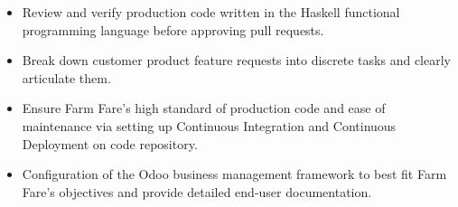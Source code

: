\documentclass[10pt,a4paper]{altacv}
\begin{document}

\begin{fullwidth}
\makecvheader
\end{fullwidth}





\small{
\begin{itemize}
\item Review and verify production code written in the Haskell functional programming language before approving pull requests.

\item Break down customer product feature requests into discrete tasks and clearly articulate them.

\item Ensure Farm Fare's high standard of production code and ease of maintenance via setting up Continuous Integration and Continuous Deployment on code repository. 

\item Configuration of the Odoo business management framework to best fit Farm Fare's objectives and provide detailed end-user documentation.

\end{itemize}
}
\end{document}
